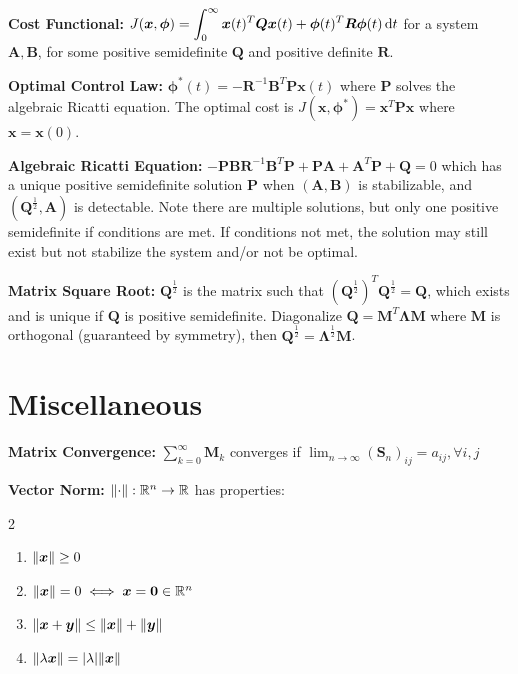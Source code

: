 \documentclass[twocolumn, 8pt]{extarticle}
\begin{document}
\textbf{Cost Functional:} \(\displaystyle J(\bm x, \bm\phi) = \int _0^\infty \bm x(t)^T\bm Q\bm x(t) + \bm\phi(t)^T\bm R\bm\phi(t)\,\mathrm{d}t\)
for a system \(\bm A, \bm B\), for some positive semidefinite \(\bm Q\) and positive definite \(\bm R\).

\textbf{Optimal Control Law:} \(\bm\phi^*(t) = -\bm R^{-1}\bm B^T\bm P\bm x(t)\) where \(\bm P\) solves the algebraic
Ricatti equation. The optimal cost is \(J(\bm x, \bm\phi^*) = \bm x^T\bm P\bm x\) where \(\bm x = \bm x(0)\).

\textbf{Algebraic Ricatti Equation:} \(-\bm P\bm B\bm R^{-1}\bm B^T\bm P + \bm P\bm A + \bm A^T\bm P + \bm Q = 0\)
which has a unique positive semidefinite solution \(\bm P\) when \((\bm A, \bm B)\) is stabilizable, and
\((\bm Q^\frac{1}{2}, \bm A)\) is detectable.
Note there are multiple solutions, but only one positive semidefinite if conditions are met.
If conditions not met, the solution may still exist but not stabilize the system and/or not be optimal.

\textbf{Matrix Square Root:} \(\bm Q^\frac{1}{2}\) is the matrix such that \((\bm Q^\frac{1}{2})^T\bm Q^\frac{1}{2} = \bm Q\),
which exists and is unique if \(\bm Q\) is positive semidefinite.
Diagonalize \(\bm Q = \bm M^T\bm\Lambda\bm M\) where \(\bm M\) is orthogonal (guaranteed by symmetry), then
\(\bm Q^\frac{1}{2} = \bm\Lambda^\frac{1}{2}\bm M\).

\section{Miscellaneous}

\textbf{Matrix Convergence:} \(\sum _{k = 0}^\infty \bm M_k\) converges if \(\displaystyle \lim _{n \to \infty} (\bm
S_n)_{ij} = a_{ij}, \forall i, j\)

\textbf{Vector Norm:} \(\lVert\cdot\rVert:\mathbb{R}^n \to \mathbb{R}\) has properties:
\vspace{-\baselineskip}
\begin{multicols}{2}
    \begin{enumerate}
        \item \(\lVert\bm x\rVert \geq 0\)
        \item \(\lVert\bm x\rVert = 0 \iff \bm x = \bm 0 \in \mathbb{R}^n\)
        \item \(\lVert\bm x + \bm y\rVert \leq \lVert\bm x\rVert + \lVert\bm y\rVert\)
        \item \(\lVert\lambda\bm x\rVert = \lvert\lambda\rvert\lVert\bm x\rVert\)
    \end{enumerate}
\end{multicols}
\vspace{-\baselineskip}
\end{document}
